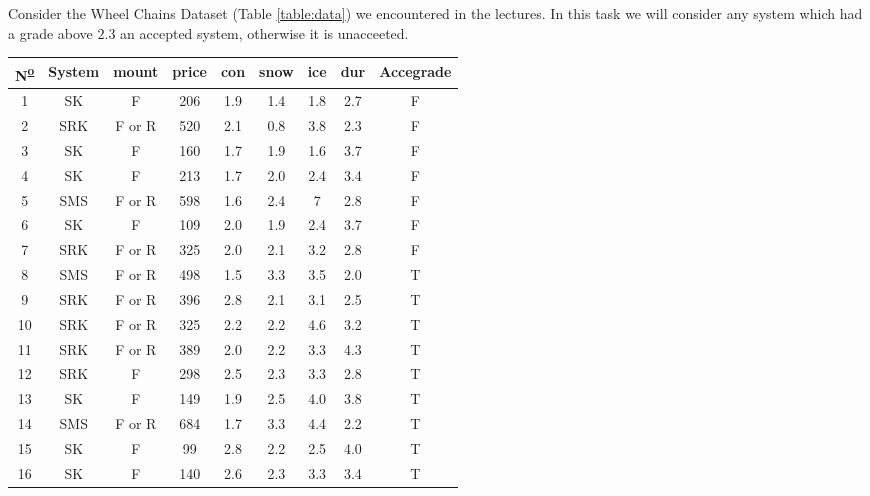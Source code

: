 \documentclass[12pt]{report}
\begin{document}
\boldmath
{}
\begin{problem}{}
    Consider the Wheel Chains Dataset (Table \ref{table:data}) we encountered in the lectures. In this task we will consider any system which had a grade above $2.3$ an accepted system, otherwise it is unacceeted.
    \begin{table}[H]
        \centering
        \begin{tabular}{|c|c|c|c|c|c|c|c|c|}
        \hline
        N\textsuperscript{\underline{o}}  & System & mount  & price & con & snow & ice & dur & Accegrade \\ \hline
        1  & SK     & F      & 206   & 1.9 & 1.4  & 1.8 & 2.7 & F         \\ \hline
        2  & SRK    & F or R & 520   & 2.1 & 0.8  & 3.8 & 2.3 & F         \\ \hline
        3  & SK     & F      & 160   & 1.7 & 1.9  & 1.6 & 3.7 & F         \\ \hline
        4  & SK     & F      & 213   & 1.7 & 2.0  & 2.4 & 3.4 & F         \\ \hline
        5  & SMS    & F or R & 598   & 1.6 & 2.4  & 7   & 2.8 & F         \\ \hline
        6  & SK     & F      & 109   & 2.0 & 1.9  & 2.4 & 3.7 & F         \\ \hline
        7  & SRK    & F or R & 325   & 2.0 & 2.1  & 3.2 & 2.8 & F         \\ \hline
        8  & SMS    & F or R & 498   & 1.5 & 3.3  & 3.5 & 2.0 & T         \\ \hline
        9  & SRK    & F or R & 396   & 2.8 & 2.1  & 3.1 & 2.5 & T         \\ \hline
        10 & SRK    & F or R & 325   & 2.2 & 2.2  & 4.6 & 3.2 & T         \\ \hline
        11 & SRK    & F or R & 389   & 2.0 & 2.2  & 3.3 & 4.3 & T         \\ \hline
        12 & SRK    & F      & 298   & 2.5 & 2.3  & 3.3 & 2.8 & T         \\ \hline
        13 & SK     & F      & 149   & 1.9 & 2.5  & 4.0 & 3.8 & T         \\ \hline
        14 & SMS    & F or R & 684   & 1.7 & 3.3  & 4.4 & 2.2 & T         \\ \hline
        15 & SK     & F      & 99    & 2.8 & 2.2  & 2.5 & 4.0 & T         \\ \hline
        16 & SK     & F      & 140   & 2.6 & 2.3  & 3.3 & 3.4 & T         \\ \hline

\end{tabular}
\end{table}
\end{problem}
\end{document}
